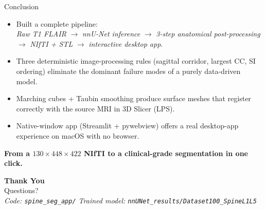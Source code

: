 \documentclass[aspectratio=169,11pt]{beamer}
\begin{document}
\begin{frame}{Conclusion}
  \begin{itemize}
    \item Built a complete pipeline:\\
          \emph{Raw T1 FLAIR} $\to$ \emph{nnU-Net inference} $\to$
          \emph{3-step anatomical post-processing} $\to$
          \emph{NIfTI + STL} $\to$ \emph{interactive desktop app}.
    \item Three deterministic image-processing rules (sagittal corridor,
          largest CC, SI ordering) eliminate the dominant failure modes
          of a purely data-driven model.
    \item Marching cubes + Taubin smoothing produce surface meshes that
          register correctly with the source MRI in 3D Slicer (LPS).
    \item Native-window app (Streamlit + pywebview) offers a real
          desktop-app experience on macOS with no browser.
  \end{itemize}
  \vspace{0.6em}
  \begin{center}
    \large\bfseries\color{accent}
    From a $130\times448\times422$ NIfTI to a clinical-grade segmentation
    in one click.
  \end{center}
\end{frame}

\begin{frame}[plain]
  \begin{center}
    \vspace{1.5cm}
    {\Huge\bfseries Thank You}\\[1em]
    {\large Questions?}\\[2em]
    \footnotesize\itshape
    Code: \texttt{spine\_seg\_app/}\quad
    Trained model: \texttt{nnUNet\_results/Dataset100\_SpineL1L5}
  \end{center}
\end{frame}
\end{document}
